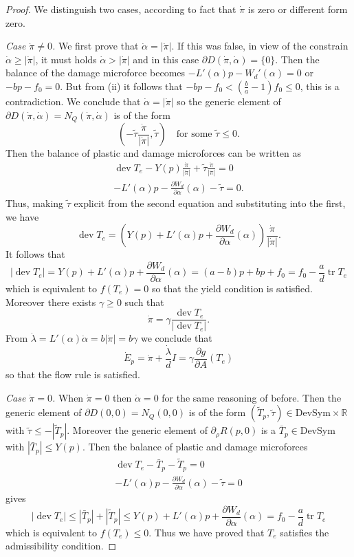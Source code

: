 \documentclass[a4paper,10pt,twoside]{amsbook}
\numberwithin{section}{chapter}
\numberwithin{equation}{chapter}
\theoremstyle{definition}
\DeclareMathOperator{\dev}{dev}
\DeclareMathOperator{\tr}{tr}
\newcommand{\dind}[2]{\frac{\partial #1}{\partial #2}}
\begin{document}
\begin{proof}
We distinguish two cases, according to fact that $\dot\pi$ is zero or different form zero.

\textit{Case $\dot\pi\neq0$.} We first prove that $\dot\alpha=|\dot\pi|$. If this was false, in view of the constrain $\dot\alpha\ge|\dot\pi|$, it must holds $\dot\alpha>|\dot\pi|$ and in this case $\partial D(\dot\pi,\dot\alpha)=\{0\}$. Then the balance of the damage microforce becomes $-L'(\alpha)p-W_d'(\alpha)=0$ or $-bp-f_0=0$. But from (ii) it follows that $-bp-f_0<\left(\frac{b}{a}-1\right)f_0\le0$, this is a contradiction. We conclude that $\dot\alpha=|\dot\pi|$ so the generic element of $\partial D(\dot\pi,\dot\alpha)=N_Q(\dot\pi,\dot\alpha)$ is of the form
\[
\left(-\tilde\tau\frac{\dot\pi}{|\dot\pi|},\tilde\tau\right)\quad\text{for some $\tilde\tau\le0$}.
\]
Then the balance of plastic and damage microforces can be written as
\begin{gather}
\dev T_e-Y(p)\frac{\dot\pi}{|\dot\pi|}+\tilde\tau\frac{\dot\pi}{|\dot\pi|}=0 \\
-L'(\alpha)p-\dind{W_d}{\alpha}(\alpha)-\tilde\tau=0.
\end{gather}
Thus, making $\tilde\tau$ explicit from the second equation and substituting into the first, we have
\[
\dev T_e=\left(Y(p)+L'(\alpha)p+\dind{W_d}{\alpha}(\alpha)\right)\frac{\dot\pi}{|\dot\pi|}.
\]
It follows that
\[
|\dev T_e|=Y(p)+L'(\alpha)p+\dind{W_d}{\alpha}(\alpha)=(a-b)p+bp+f_0=f_0-\frac{a}{d}\tr T_e
\]
which is equivalent to $f(T_e)=0$ so that the yield condition is satisfied. Moreover there exists $\gamma\ge0$ such that
\[
\dot\pi=\gamma\frac{\dev T_e}{|\dev T_e|}.
\]
From $\dot\lambda=L'(\alpha)\dot\alpha=b|\dot\pi|=b\gamma$ we conclude that
\[
\dot E_p=\dot\pi+\frac{\dot\lambda}{d}I=\gamma\dind{g}{A}(T_e)
\]
so that the flow rule is satisfied.

\textit{Case $\dot\pi=0$.} When $\dot\pi=0$ then $\dot\alpha=0$ for the same reasoning of before. Then the generic element of $\partial D(0,0)=N_Q(0,0)$ is of the form $(\tilde T_p,\tilde\tau)\in\text{DevSym}\times\mathbb{R}$ with $\tilde\tau\le-|\tilde T_p|$. Moreover the generic element of $\partial_\rho R(p,0)$ is a $\bar T_p\in\text{DevSym}$ with $|\bar T_p|\le Y(p)$. Then the balance of plastic and damage microforces
\begin{gather}
\dev T_e-\bar T_p-\tilde T_p=0 \\
-L'(\alpha)p-\dind{W_d}{\alpha}(\alpha)-\tilde\tau=0
\end{gather}
gives
\[
|\dev T_e|\le|\bar T_p|+|\tilde T_p|\le Y(p)+L'(\alpha)p+\dind{W_d}{\alpha}(\alpha)=f_0-\frac{a}{d}\tr T_e
\]
which is equivalent to $f(T_e)\le0$. Thus we have proved that $T_e$ satisfies the admissibility condition.
\end{proof}
\end{document}
